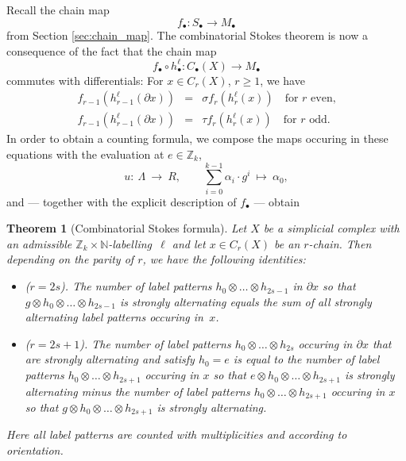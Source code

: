 \documentclass[11pt,a4paper,draft]{article}
\newcommand{\Z}{{\mathbb Z}}
\newcommand{\N}{{\mathbb N}}
\newtheorem{theorem}{Theorem}[section]
\theoremstyle{definition}
\begin{document}
Recall the chain map
\[
      f_\bullet : S_\bullet \to M_\bullet
\]
from Section \ref{sec:chain_map}. The combinatorial Stokes theorem is now
a consequence of the fact that the chain map
\[
     f_\bullet \circ h^{\ell}_{\bullet} : C_\bullet(X)  \to M_\bullet
\]
commutes with differentials:  For $x \in C_{r}(X)$, $r \geq 1$, we have
\begin{eqnarray*}
     f_{r-1}(h^{\ell}_{r-1} (\partial x)) & = & \sigma f_r (h^{\ell}_r (x))
     \quad\textrm{for }r\textrm{ even,} \\
     f_{r-1}(h^{\ell}_{r-1} (\partial x)) & = & \tau   f_r (h^{\ell}_r (x)) 
     \quad\textrm{for }r\textrm{ odd.}
\end{eqnarray*}
In order to obtain a counting formula, we compose the maps occuring in these 
equations with the evaluation at $e \in \Z_k$,  
\[
    u :\ \Lambda\ \to\ R, \qquad 
  \sum_{i=0}^{k-1} \alpha_i \cdot g^i\ \mapsto\ \alpha_0 , 
\]
and --- together with the explicit description of $f_{\bullet}$ --- obtain


\begin{theorem}[Combinatorial Stokes formula]\label{thm:stokes}
Let $X$ be a simplicial complex with an admissible
$\Z_k\times\N$-labelling~$\ell$ and let $x\in C_r(X)$ be an $r$-chain.
Then depending on the parity of $r$, we have the following identities:

\begin{itemize}
    \item ($r=2s$). The number of label patterns $h_0 \otimes \ldots \otimes h_{2s-1}$ in $\partial x$
                    so that $g \otimes h_0 \otimes \ldots \otimes h_{2s-1}$ is strongly alternating
                    equals the sum of all strongly alternating label patterns occuring in~$x$.
    \item ($r = 2s+1$). The number of label patterns $h_0 \otimes \ldots \otimes h_{2s}$ occuring in $\partial x$
                        that are strongly alternating and satisfy $h_0 = e$ is
                        equal to the number of label patterns $h_0 \otimes \ldots \otimes h_{2s+1}$
                        occuring in $x$ so that $e \otimes h_0 \otimes \ldots \otimes h_{2s+1}$ is strongly
                        alternating
                        minus the number of label patterns $h_0 \otimes \ldots \otimes h_{2s+1}$
                        occuring in $x$ so that $g \otimes h_0 \otimes \ldots \otimes h_{2s +1}$ is strongly alternating.
\end{itemize}
Here all label patterns are counted with multiplicities and according to orientation.
\end{theorem}
\end{document}
